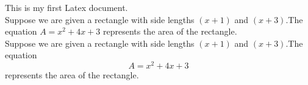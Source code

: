 \documentclass[11]{article}
\begin{document}
This is my first Latex document.\\

Suppose we are given a rectangle with side lengths $(x+1)$ and $(x+3)$.The equation $A = x^2+4x+3$ represents the area of the rectangle.\\

Suppose we are given a rectangle with side lengths $(x+1)$ and $(x+3)$.The equation $$A = x^2+4x+3$$ represents the area of the rectangle.
\end{document}
